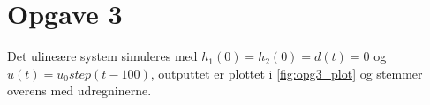 \section{Opgave 3}
Det ulineære system simuleres med $h_1(0) = h_2(0) = d(t) = 0$ og $u(t) =
u_0 step(t-100)$, outputtet er plottet i \ref{fig:opg3_plot} og stemmer overens
med udregninerne.

